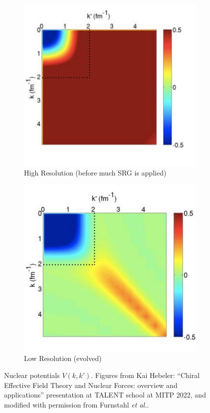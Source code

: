 \documentclass[a4paper,11pt]{article}
\newcommand{\etal}{\textit{et al.}}
\begin{document}
\begin{figure}[H]
  \centering
  \begin{subfigure}{0.45\textwidth}
    \centering
    \includegraphics[width=\linewidth]{HighRes.png}
    \caption{High Resolution (before much SRG is applied) }
    \label{fig:highres}
  \end{subfigure}
  \hfill
  \begin{subfigure}{0.45\textwidth}
    \centering
    \includegraphics[width=\linewidth]{LowRes.png}
    \caption{Low Resolution (evolved)}
    \label{fig:lowres}
  \end{subfigure}
  \caption{Nuclear potentials $V(k,k')$. Figures from Kai Hebeler:
    ``Chiral Effective Field Theory and Nuclear Forces:
    overview and applications'' presentation at TALENT school at MITP
    2022, and modified with permission from
    Furnstahl \etal \cite{Furnstahl2013}.
  }
  \label{fig:SRGtransform}
\end{figure}
\end{document}
